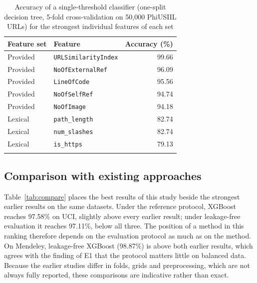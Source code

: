 \documentclass[pdflatex,sn-mathphys-num]{sn-jnl}%
\theoremstyle{thmstyleone}%
\theoremstyle{thmstyletwo}%
\theoremstyle{thmstylethree}%
\begin{document}
\begin{table}[htbp]
\caption{Accuracy of a single-threshold classifier (one-split decision tree, 5-fold cross-validation on 50,000 PhiUSIIL URLs) for the strongest individual features of each set}\label{tab:features}%
\begin{tabular}{@{}llr@{}}
\toprule
Feature set & Feature & Accuracy (\%) \\
\midrule
Provided & \texttt{URLSimilarityIndex} & 99.66 \\
Provided & \texttt{NoOfExternalRef} & 96.09 \\
Provided & \texttt{LineOfCode} & 95.56 \\
Provided & \texttt{NoOfSelfRef} & 94.74 \\
Provided & \texttt{NoOfImage} & 94.18 \\
Lexical & \texttt{path\_length} & 82.74 \\
Lexical & \texttt{num\_slashes} & 82.74 \\
Lexical & \texttt{is\_https} & 79.13 \\
\botrule
\end{tabular}
\end{table}

\subsection{Comparison with existing approaches}\label{subsec5-4}

Table~\ref{tab:compare} places the best results of this study beside the strongest earlier results on the same datasets. Under the reference protocol, XGBoost reaches 97.58\% on UCI, slightly above every earlier result; under leakage-free evaluation it reaches 97.11\%, below all three. The position of a method in this ranking therefore depends on the evaluation protocol as much as on the method. On Mendeley, leakage-free XGBoost (98.87\%) is above both earlier results, which agrees with the finding of E1 that the protocol matters little on balanced data. Because the earlier studies differ in folds, grids and preprocessing, which are not always fully reported, these comparisons are indicative rather than exact.
\end{document}
